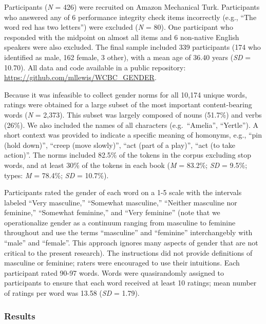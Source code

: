 \documentclass[
  english,
  ,man,floatsintext]{apa6}
\begin{document}
Participants (\emph{N} = 426) were recruited on Amazon Mechanical Turk. Participants who answered any of 6 performance integrity check items incorrectly (e.g., \enquote{The word red has two letters}) were excluded (\emph{N} = 80). One participant who responded with the midpoint on almost all items and 6 non-native English speakers were also excluded. The final sample included 339 participants (174 who identified as male, 162 female, 3 other), with a mean age of 36.40 years (\emph{SD} = 10.70). All data and code available in a public repository: \url{https://github.com/mllewis/WCBC_GENDER}.

Because it was infeasible to collect gender norms for all 10,174 unique words, ratings were obtained for a large subset of the most important content-bearing words (\emph{N} = 2,373). This subset was largely composed of nouns (51.7\%) and verbs (26\%). We also included the names of all characters (e.g.~\enquote{Amelia}, \enquote{Yertle}). A short context was provided to indicate a specific meaning of homonyms, e.g., \enquote{pin (hold down)}, \enquote{creep (move slowly)}, \enquote{act (part of a play)}, \enquote{act (to take action)}. The norms included 82.5\% of the tokens in the corpus excluding stop words, and at least 30\% of the tokens in each book (\emph{M} = 83.2\%; \emph{SD} = 9.5\%; types: \emph{M} = 78.4\%; \emph{SD} = 10.7\%).

Participants rated the gender of each word on a 1-5 scale with the intervals labeled \enquote{Very masculine,} \enquote{Somewhat masculine,} \enquote{Neither masculine nor feminine,} \enquote{Somewhat feminine,} and \enquote{Very feminine} (note that we operationalize gender as a continuum ranging from masculine to feminine throughout and use the terms \enquote{masculine} and \enquote{feminine} interchangebly with \enquote{male} and \enquote{female}. This approach ignores many aspects of gender that are not critical to the present research). The instructions did not provide definitions of masculine or feminine; raters were encouraged to use their intuitions. Each participant rated 90-97 words. Words were quasirandomly assigned to participants to ensure that each word received at least 10 ratings; mean number of ratings per word was 13.58 (\emph{SD} = 1.79).

\hypertarget{results}{%
\subsubsection{Results}\label{results}}
\end{document}
